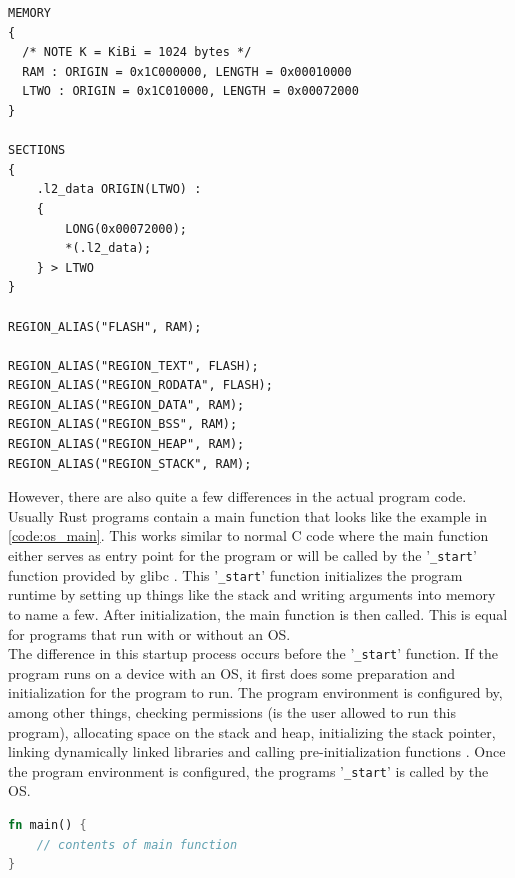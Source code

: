 \begin{lstlisting}[style=colorEX,caption={Example memory.x file},label={code:memory_x}]
MEMORY
{
  /* NOTE K = KiBi = 1024 bytes */
  RAM : ORIGIN = 0x1C000000, LENGTH = 0x00010000
  LTWO : ORIGIN = 0x1C010000, LENGTH = 0x00072000
}

SECTIONS
{
    .l2_data ORIGIN(LTWO) :
    {
        LONG(0x00072000);
        *(.l2_data);
    } > LTWO
}

REGION_ALIAS("FLASH", RAM);

REGION_ALIAS("REGION_TEXT", FLASH);
REGION_ALIAS("REGION_RODATA", FLASH);
REGION_ALIAS("REGION_DATA", RAM);
REGION_ALIAS("REGION_BSS", RAM);
REGION_ALIAS("REGION_HEAP", RAM);
REGION_ALIAS("REGION_STACK", RAM);

\end{lstlisting}


However, there are also quite a few differences in the actual program code. Usually Rust programs contain a main function that looks like the example in \ref{code:os_main}.
This works similar to normal C code where the main function either serves as entry point for the program or will be called by the '\lstinline{_start}' function provided by glibc \cite{before_main}.
This '\lstinline{_start}' function initializes the program runtime by setting up things like the stack and writing arguments into memory to name a few.
After initialization, the main function is then called.
This is equal for programs that run with or without an OS.\\
The difference in this startup process occurs before the '\lstinline{_start}' function.
If the program runs on a device with an OS, it first does some preparation and initialization for the program to run.
The program environment is configured by, among other things, checking permissions (is the user allowed to run this program),
allocating space on the stack and heap, initializing the stack pointer, linking dynamically linked libraries and calling pre-initialization functions \cite{before_main}.
Once the program environment is configured, the programs '\lstinline{_start}' is called by the OS.

\begin{lstlisting}[style=colorEX,language=Rust,caption={Standard main function in Rust},label={code:os_main}]
fn main() {
    // contents of main function
}
\end{lstlisting}

